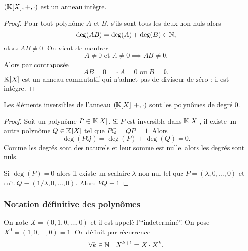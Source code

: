 \begin{cor}
  \((\mathbb{K}[X],+,\cdot)\) est un anneau intègre.
\end{cor}
\begin{proof}
  Pour tout polynôme \(A\) et \(B\), s'ils sont tous les deux non nuls alors
  \begin{equation}
    \deg(AB) = \deg(A)+\deg(B) \in \mathbb{N},
  \end{equation}
  alors \(AB \neq 0\). On vient de montrer
  \begin{equation}
    A\neq 0 \text{~et~} A \neq 0 \implies AB \neq 0.
  \end{equation}
  Alors par contraposée
  \begin{equation}
    AB = 0 \implies A = 0 \text{~ou~} B = 0.
  \end{equation}
  \(\mathbb{K}[X]\) est un anneau commutatif qui n'admet pas de diviseur de zéro : il
  est intègre.
\end{proof}

\begin{prop}
  Les éléments inversibles de l'anneau \((\mathbb{K}[X],+,\cdot)\) sont les polynômes de
  degré \(0\).
\end{prop}
\begin{proof}
  Soit un polynôme \(P \in \mathbb{K}[X]\). Si \(P\) est inversible dans \(\mathbb{K}[X]\), il
  existe un autre polynôme \(Q \in \mathbb{K}[X]\) tel que \(PQ = QP = 1\). Alors
  \begin{equation}
    \deg(PQ) = \deg(P)+\deg(Q) = 0.
  \end{equation}
  Comme les degrés sont des naturels et leur somme est nulle, alors les degrés
  sont nuls.

  Si \(\deg(P) = 0\) alors il existe un scalaire \(\lambda\) non nul tel que
  \(P = (\lambda,0, \ldots, 0)\) et soit \(Q = (1/\lambda, 0, \ldots, 0)\). Alors
  \(PQ = 1\)
\end{proof}

\subsubsection{Notation définitive des polynômes}

On note \(X = (0,1,0, \ldots, 0)\) et il est appelé l'``indeterminé''. On pose
\(X^0 = (1,0, \ldots,0) = 1\). On définit par récurrence
\begin{equation}
  \forall k \in \mathbb{N} \quad X^{k+1} = X \cdot X^k.
\end{equation}

